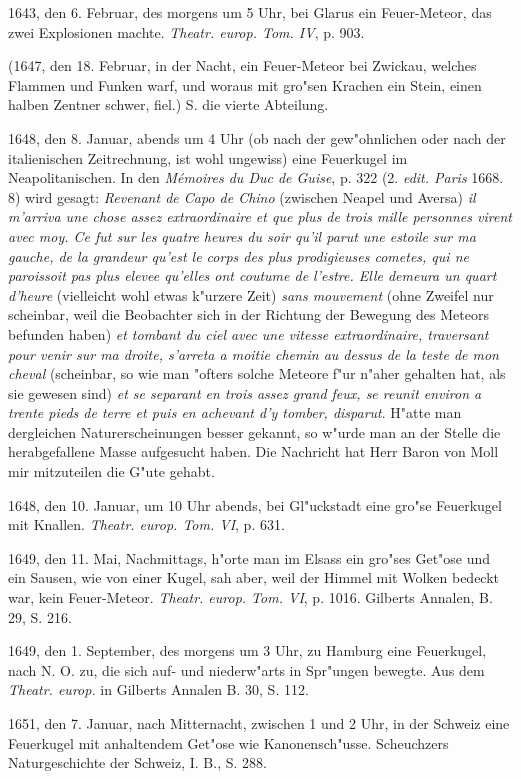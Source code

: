 \documentclass[a4paper, 11pt, oneside, polutonikogreek, german]{article}
\begin{document}
1643, den 6. Februar, des morgens um 5 Uhr, bei Glarus ein Feuer-Meteor, das zwei Explosionen machte. \emph{Theatr. europ. Tom. IV}, p. 903.

(1647, den 18. Februar, in der Nacht, ein Feuer-Meteor bei Zwickau, welches Flammen und Funken warf, und woraus mit gro"sen Krachen ein Stein, einen halben Zentner schwer, fiel.) S. die vierte Abteilung.

1648, den 8. Januar, abends um 4 Uhr (ob nach der gew"ohnlichen oder nach der italienischen Zeitrechnung, ist wohl ungewiss) eine Feuerkugel im Neapolitanischen. In den \emph{Mémoires du Duc de Guise}, p. 322 (2. \emph{edit. Paris} 1668. 8) wird gesagt: \emph{Revenant de Capo de Chino} (zwischen Neapel und Aversa) \emph{il m'arriva une chose assez extraordinaire et que plus de trois mille personnes virent avec moy. Ce fut sur les quatre heures du soir qu'il parut une estoile sur ma gauche, de la grandeur qu'est le corps des plus prodigieuses cometes, qui ne paroissoit pas plus elevee qu'elles ont coutume de l'estre. Elle demeura un quart d'heure} (vielleicht wohl etwas k"urzere Zeit) \emph{sans mouvement} (ohne Zweifel nur scheinbar, weil die Beobachter sich in der Richtung der Bewegung des Meteors befunden haben) \emph{et tombant du ciel avec une vitesse extraordinaire, traversant pour venir sur ma droite, s'arreta a moitie chemin au dessus de la teste de mon cheval} (scheinbar, so wie man "ofters solche Meteore f"ur n"aher gehalten hat, als sie gewesen sind) \emph{et se separant en trois assez grand feux, se reunit environ a trente pieds de terre et puis en achevant d'y tomber, disparut}. H"atte man dergleichen Naturerscheinungen besser gekannt, so w"urde man an der Stelle die herabgefallene Masse aufgesucht haben. Die Nachricht hat Herr Baron von Moll mir mitzuteilen die G"ute gehabt.

1648, den 10. Januar, um 10 Uhr abends, bei Gl"uckstadt eine gro"se Feuerkugel mit Knallen. \emph{Theatr. europ. Tom. VI}, p. 631.

1649, den 11. Mai, Nachmittags, h"orte man im Elsass ein gro"ses Get"ose und ein Sausen, wie von einer Kugel, sah aber, weil der Himmel mit Wolken bedeckt war, kein Feuer-Meteor. \emph{Theatr. europ. Tom. VI}, p. 1016. Gilberts Annalen, B. 29, S. 216.

1649, den 1. September, des morgens um 3 Uhr, zu Hamburg eine Feuerkugel, nach N. O. zu, die sich auf- und niederw"arts in Spr"ungen bewegte. Aus dem \emph{Theatr. europ.} in Gilberts Annalen B. 30, S. 112.

1651, den 7. Januar, nach Mitternacht, zwischen 1 und 2 Uhr, in der Schweiz eine Feuerkugel mit anhaltendem Get"ose wie Kanonensch"usse. Scheuchzers Naturgeschichte der Schweiz, I. B., S. 288.
\end{document}
